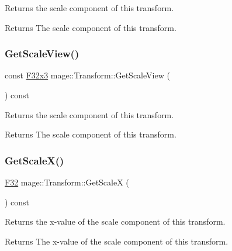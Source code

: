 Returns the scale component of this transform.

\begin{DoxyReturn}{Returns}
The scale component of this transform. 
\end{DoxyReturn}
\mbox{\label{classmage_1_1_transform_a7b51394c05f161d20fa630ace871d5a5}} 
\subsubsection{\texorpdfstring{Get\+Scale\+View()}{GetScaleView()}}
{\footnotesize\ttfamily const \mbox{\hyperlink{namespacemage_a1e3c7a882af461f161caa1cbddaf1fa2}{F32x3}} mage\+::\+Transform\+::\+Get\+Scale\+View (\begin{DoxyParamCaption}{ }\end{DoxyParamCaption}) const\hspace{0.3cm}{\ttfamily [noexcept]}}

Returns the scale component of this transform.

\begin{DoxyReturn}{Returns}
The scale component of this transform. 
\end{DoxyReturn}
\mbox{\label{classmage_1_1_transform_a86eff370d6cb37a7aa5f7d78d4cf3cf4}} 
\subsubsection{\texorpdfstring{Get\+Scale\+X()}{GetScaleX()}}
{\footnotesize\ttfamily \mbox{\hyperlink{namespacemage_aa97e833b45f06d60a0a9c4fc22ae02c0}{F32}} mage\+::\+Transform\+::\+Get\+ScaleX (\begin{DoxyParamCaption}{ }\end{DoxyParamCaption}) const\hspace{0.3cm}{\ttfamily [noexcept]}}

Returns the x-\/value of the scale component of this transform.

\begin{DoxyReturn}{Returns}
The x-\/value of the scale component of this transform. 
\end{DoxyReturn}
\mbox{\label{classmage_1_1_transform_a17bd579657e31fbdc1eacec0836140c5}} 
